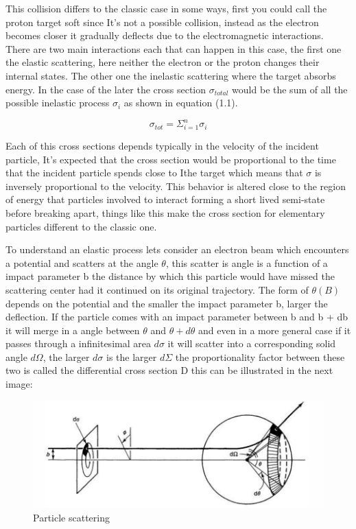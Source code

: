 This collision differs to the classic case in some ways, first you could call the proton target soft since It's not a possible collision, instead as the electron becomes closer it gradually deflects due to the electromagnetic interactions. There are two main interactions each that can happen in this case, the first one the elastic scattering, here neither the electron or the proton changes their internal states. The other one the inelastic scattering where the target absorbs energy. In the case of the later the cross section $\sigma_{total}$ would be the sum of all the possible inelastic process $\sigma_{i}$ as shown in equation (1.1). 

\begin{equation}
\sigma_{tot} = \Sigma^{n}_{i=1} \sigma_{i}
\end{equation}

Each of this cross sections depends typically in the velocity of the incident particle, It's expected that the cross section would be proportional to the time that the incident particle spends close to Ithe target which means that $\sigma$ is inversely proportional to the velocity. This behavior is altered close to the region of energy that particles involved to interact forming a short lived semi-state before breaking apart, things like this make the cross section for elementary particles different to the classic one. 

To understand an elastic process lets consider an electron beam which encounters a potential and scatters at the angle $\theta$, this scatter is angle is a function of a impact parameter b the distance by which this particle would have missed the scattering center had it continued on its original trajectory. The form of $\theta(B)$ depends on the potential and the smaller the impact parameter b, larger the deflection. If the particle comes with an impact parameter between b and b + db it will merge in a angle between $\theta$ and $\theta + d\theta$ and even in a more general case if it passes through a infinitesimal area $d\sigma$ it will scatter into a corresponding solid angle $d\Omega$, the larger $d\sigma$ is the larger $d\Sigma$ the proportionality factor between these two is called the differential cross section D this can be illustrated in the next image: 

\begin{figure}[h]
    \centering
   \includegraphics[width=1\textwidth]{cross1.png}
    \caption{Particle scattering}
    \label{fig:cross}
\end{figure}

